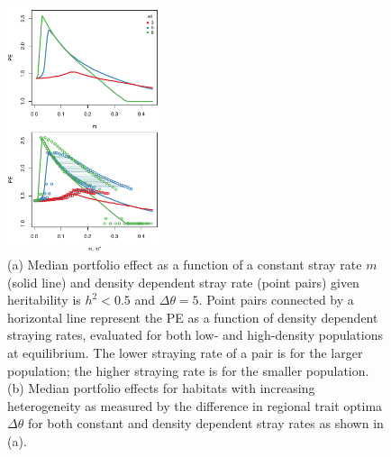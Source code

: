 \documentclass[twocolumn,preprintnumbers,amsmath,amssymb,superscriptaddress]{revtex4}
\begin{document}
\begin{figure}
  \captionsetup{justification=raggedright,
singlelinecheck=false
}
\centering
\includegraphics[width=0.4\textwidth]{figs2/fig_thetaPEmvm.pdf}
\caption{
(a) Median portfolio effect as a function of a constant stray rate $m$ (solid line) and density dependent stray rate (point pairs) given heritability is $h^2 < 0.5$ and $\Delta\theta=5$.
Point pairs connected by a horizontal line represent the PE as a function of density dependent straying rates, evaluated for both low- and high-density populations at equilibrium. The lower straying rate of a pair is for the larger population; the higher straying rate is for the smaller population.
(b) Median portfolio effects for habitats with increasing heterogeneity as measured by the difference in regional trait optima $\Delta \theta$ for both constant and density dependent stray rates as shown in (a).
} \label{fig:thetaPE}
\end{figure}


\end{document}
